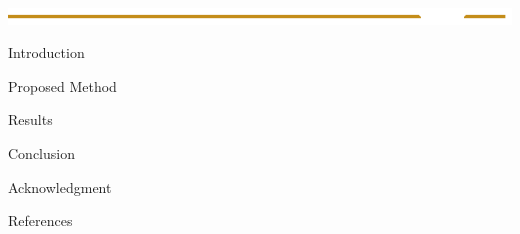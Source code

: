 \documentclass[paperwidth=48in,paperheight=42in,landscape]{baposter}
\begin{document}
\begin{poster}
{  \includegraphics[height=0.35\headerheight]{ucsdECE}


}


\begin{posterbox}[name=abstract,column=0]{Introduction}
%

\end{posterbox}

\begin{posterbox}[name=propsedMethod,column=1,span=2]{Proposed Method}

\end{posterbox}

\begin{posterbox}[name=results,column=1,below=propsedMethod]{Results}

\end{posterbox}

\begin{posterbox}[name=conclusion,column=2,below=propsedMethod]{Conclusion}

\end{posterbox}

\begin{posterbox}[name=acknowledgment,column=2,below=conclusion]{Acknowledgment}

\end{posterbox}

\begin{posterbox}[name=references,column=2,below=acknowledgment]{References}
\nocite{bal:cha:gra:pae}


\end{posterbox}

\end{poster}
\end{document}
